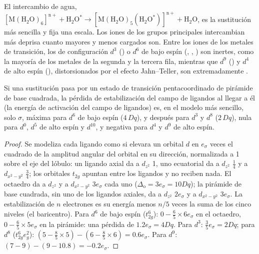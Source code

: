 El intercambio de agua, $\mathrm{[M(H_2O)_6]^{n+} + H_2O^{\ast} \to [M(H_2O)_5(H_2O^{\ast})]^{n+} + H_2O}$, es la sustitución
más sencilla y fija una escala. Los iones de los grupos principales intercambian más deprisa cuanto
mayores y menos cargados son. Entre los iones de los metales de transición, los de configuración $d^3$
() o $d^6$ de bajo espín (, , ) son inertes, como
la mayoría de los metales de la segunda y la tercera fila, mientras que $d^9$ () y $d^4$ de alto espín (),
distorsionados por el efecto Jahn--Teller, son extremadamente .

\begin{proposition}\label{prop:b3:complex-mechanisms:lfae}
Si una sustitución pasa por un estado de transición pentacoordinado de pirámide de base
cuadrada, la pérdida de estabilización del campo de ligandos al llegar a él (la energía de
activación del campo de ligandos) es, en el modelo más sencillo, solo $\sigma$, máxima para $d^6$ de bajo espín
($4\,Dq$), y después para $d^3$ y $d^8$ ($2\,Dq$), nula para $d^0$, $d^5$ de alto espín y $d^{10}$, y negativa
para $d^4$ y $d^9$ de alto espín.
\end{proposition}

\begin{proof}
Se modeliza cada ligando como si elevara un orbital $d$ en $e_\sigma$ veces el cuadrado de la
amplitud angular del orbital en su dirección, normalizada a 1 sobre el eje del lóbulo: un ligando
axial da a $d_{z^2}$ 1, uno ecuatorial da a $d_{z^2}$ $\frac14$ y a $d_{x^2-y^2}$ $\frac34$; los orbitales $t_{2g}$ apuntan
entre los ligandos y no reciben nada. El octaedro da a $d_{z^2}$ y a $d_{x^2-y^2}$ $3e_\sigma$ cada uno
($\Delta_{\mathrm o} = 3e_\sigma = 10Dq$); la pirámide de base cuadrada, sin uno de los ligandos axiales, da a $d_{z^2}$ $2e_\sigma$ y a
$d_{x^2-y^2}$ $3e_\sigma$. La estabilización de $n$ electrones es su energía menos $n/5$ veces la suma de
los cinco niveles (el baricentro). Para $d^6$ de bajo espín ($t_{2g}^6$): $0 - \frac65 \times 6e_\sigma$ en el
octaedro, $0 - \frac65 \times 5e_\sigma$ en la pirámide: una pérdida de $1.2e_\sigma = 4Dq$. Para $d^3$: $\frac35e_\sigma =
2Dq$; para $d^8$ ($t_{2g}^6e_g^2$): $(5 - \frac85 \times 5) - (6 - \frac85 \times 6) = 0.6e_\sigma$. Para $d^9$: $(7 - 9) - (9 -
10.8) = -0.2e_\sigma$.
\end{proof}


